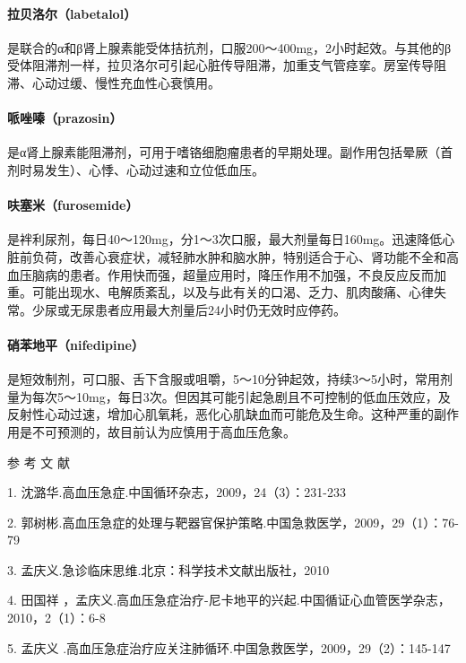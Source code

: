 \paragraph{拉贝洛尔（labetalol）}

是联合的α和β肾上腺素能受体拮抗剂，口服200～400mg，2小时起效。与其他的β受体阻滞剂一样，拉贝洛尔可引起心脏传导阻滞，加重支气管痉挛。房室传导阻滞、心动过缓、慢性充血性心衰慎用。

\paragraph{哌唑嗪（prazosin）}

是α肾上腺素能阻滞剂，可用于嗜铬细胞瘤患者的早期处理。副作用包括晕厥（首剂时易发生）、心悸、心动过速和立位低血压。

\paragraph{呋塞米（furosemide）}

是袢利尿剂，每日40～120mg，分1～3次口服，最大剂量每日160mg。迅速降低心脏前负荷，改善心衰症状，减轻肺水肿和脑水肿，特别适合于心、肾功能不全和高血压脑病的患者。作用快而强，超量应用时，降压作用不加强，不良反应反而加重。可能出现水、电解质紊乱，以及与此有关的口渴、乏力、肌肉酸痛、心律失常。少尿或无尿患者应用最大剂量后24小时仍无效时应停药。

\paragraph{硝苯地平（nifedipine）}

是短效制剂，可口服、舌下含服或咀嚼，5～10分钟起效，持续3～5小时，常用剂量为每次5～10mg，每日3次。但因其可能引起急剧且不可控制的低血压效应，及反射性心动过速，增加心肌氧耗，恶化心肌缺血而可能危及生命。这种严重的副作用是不可预测的，故目前认为应慎用于高血压危象。
\protect\hypertarget{text00109.html}{}{}

\hypertarget{text00109.htmlux5cux23CHP4-7-4}{}
参 考 文 献

1. 沈潞华.高血压急症.中国循环杂志，2009，24（3）：231-233

2.
郭树彬.高血压急症的处理与靶器官保护策略.中国急救医学，2009，29（1）：76-79

3. 孟庆义.急诊临床思维.北京：科学技术文献出版社，2010

4. 田国祥
，孟庆义.高血压急症治疗-尼卡地平的兴起.中国循证心血管医学杂志，2010，2（1）：6-8

5. 孟庆义
.高血压急症治疗应关注肺循环.中国急救医学，2009，29（2）：145-147

